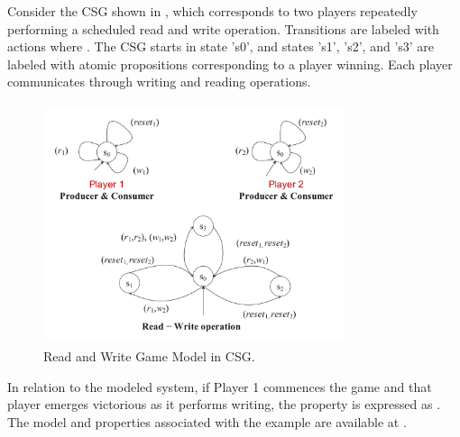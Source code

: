 \begin{example}
\label{exp:csg:architecture}   
Consider the CSG shown in , which corresponds to two players repeatedly performing a scheduled read and write operation. Transitions are labeled with actions where . The CSG starts in state 's0', and states 's1', 's2', and 's3' are labeled with atomic propositions corresponding to a player winning. Each player communicates through writing and reading operations.
\noindent
\begin{figure}[!htb]
    \centering
  \includegraphics[width=250pt, height =200pt]{examplecsg.pdf}
    \caption{Read and Write Game Model in CSG.}
    \label{fig:even:odds}
\end{figure} 

In relation to the modeled system, if Player 1 commences the game and that player emerges victorious as it performs writing, the property is expressed as . The model and properties associated with the example are available at \cite{edcc23}. 

\end{example}

